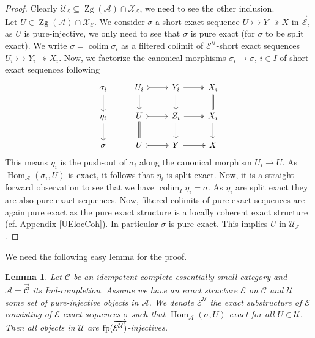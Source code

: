 \documentclass[11pt,a4paper]{amsart}
\theoremstyle{plain}
\newtheorem{lem}[thm]{Lemma}
\theoremstyle{definition}
\DeclareMathOperator{\Hom}{Hom}
\DeclareMathOperator*{\colim}{colim}
\newcommand{\defl}{\twoheadrightarrow}
\newcommand{\infl}{\rightarrowtail}
\newcommand{\mcA}{\mathcal{A}}
\newcommand{\mcC}{\mathcal{C}}
\newcommand{\mcE}{\mathcal{E}}
\newcommand{\mcU}{\mathcal{U}}
\newcommand{\mcX}{\mathcal{X}}
\DeclareMathOperator{\Zg}{Zg}
\begin{document}
\begin{proof}
Clearly $\mcU_{\mcE} \subseteq \Zg (\mcA) \cap \mcX_{\mcE}$, we need to see the other inclusion.\\ 
Let $U\in \Zg (\mcA) \cap \mcX_{\mcE}$. We consider $\sigma$ a short exact sequence $U \infl Y\defl X$ in $\overrightarrow{\mcE}$, as $U$ is pure-injective, we only need to see that $\sigma$ is pure exact (for $\sigma$ to be split exact). We write $\sigma=\colim \sigma_i$ as a filtered colimit of $\mcE^{\mcU}$-short exact sequences $U_i \infl Y_i \defl X_i$. Now, we factorize the canonical morphisms $\sigma_i \to \sigma$, $i \in I$ of short exact sequences following \cite[Prop. 3.1]{Bue}
\[
\begin{tikzcd}
\sigma_i  \arrow[d] & U_i \arrow[r, tail] \arrow[d] & Y_i \arrow[r, two heads] \arrow[d] & X_i \arrow[d,-,double equal sign distance,double] \\
\eta_i \arrow[d]    & U \arrow[r, tail] \arrow[d,-,double equal sign distance,double]   & Z_i \arrow[r, two heads] \arrow[d] & X_i \arrow[d] \\
\sigma              & U \arrow[r, tail]             & Y \arrow[r, two heads]             & X            
\end{tikzcd}
\]
This means $\eta_i$ is the push-out of $\sigma_i$ along the canonical morphism $U_i \to U$. As $\Hom_{\mcA} (\sigma_i, U)$ is exact, it follows that $\eta_i$ is split exact. Now, it is a straight forward observation to see that we have $\colim_I \eta_i =\sigma$. As $\eta_i$ are split exact they are also pure exact sequences. Now, filtered colimits of pure exact sequences are again pure exact as the pure exact structure is a locally coherent exact structure (cf. Appendix \ref{UElocCoh}). In particular $\sigma$ is pure exact. This implies $U$ in $\mcU_{\mcE}$. 
\end{proof}

    

We need the following easy lemma for the proof.
\begin{lem}\label{fp-inj}
Let $\mcC$ be an idempotent complete essentially small category and $\mcA=\overrightarrow{\mcC}$ its Ind-completion. Assume we have an exact structure $\mcE$ on $\mcC$ and $\mcU$ some set of pure-injective objects in $\mcA$. We denote $\mcE^{\mcU}$ the exact substructure of $\mcE$ consisting of $\mcE$-exact sequences $\sigma$ such that $\Hom_{\mcA} (\sigma , U)$ exact for all $U \in \mcU$. 
Then all objects in $\mcU$ are ${\rm fp} (\overrightarrow{\mcE^{\mcU})}$-injectives. 
\end{lem}
\end{document}

